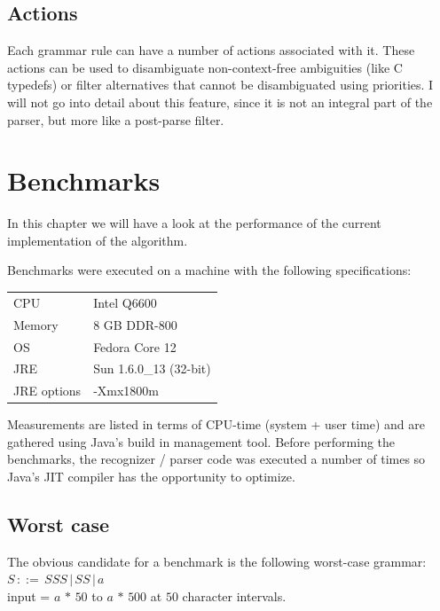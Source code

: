 \documentclass[a4paper,10pt]{article}
\begin{document}
\subsection{Actions}

Each grammar rule can have a number of actions associated with it. These actions can be used to disambiguate non-context-free ambiguities (like C typedefs) or filter alternatives that cannot be disambiguated using priorities. I will not go into detail about this feature, since it is not an integral part of the parser, but more like a post-parse filter.

\section{Benchmarks}

In this chapter we will have a look at the performance of the current implementation of the algorithm.

Benchmarks were executed on a machine with the following specifications:
\begin{table}[H]
\centering
\begin{tabular}{ | p{6em} | p{9em} | }
 \hline
 CPU & Intel Q6600 \\
 Memory & 8 GB DDR-800 \\
 OS & Fedora Core 12 \\
 JRE & Sun 1.6.0\_13 (32-bit) \\
 JRE options & -Xmx1800m \\
 \hline
\end{tabular}
\end{table}

Measurements are listed in terms of CPU-time (system + user time) and are gathered using Java's build in management tool. Before performing the benchmarks, the recognizer / parser code was executed a number of times so Java's JIT compiler has the opportunity to optimize.

\pagebreak
\subsection{Worst case}

The obvious candidate for a benchmark is the following worst-case grammar:
$S\,::=\,SSS\,|\,SS\,|\,a$\\
input = $a\,*\,50$ to $a\,*\,500$ at $50$ character intervals.
\end{document}
